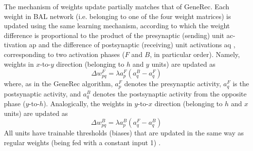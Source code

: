 The mechanism of weights update partially matches that of GeneRec. Each
weight in BAL network (i.e. belonging to one of the four weight matrices) is
updated using the same learning mechanism, according to which the weight
difference is proportional to the product of the presynaptic (sending) unit ac-
tivation ap and the difference of postsynaptic (receiving) unit activations aq ,
corresponding to two activation phases ($F$ and $B$, in particular order). Namely,
weights in $x$-to-$y$ direction (belonging to $h$ and $y$ units) are updated as
$$
\Delta w_{pq}^F = \lambda a_p^F(a_q^B - a_q^F)
$$
where, as in the GeneRec algorithm, $a^F_p$ denotes the presynaptic activity, $a^F_q$ is the postsynaptic activity, and $a^B_q$ denotes the postsynaptic activity from the opposite phase ($y$-to-$h$). Analogically, the weights in $y$-to-$x$ direction (belonging to $h$ and $x$ units) are updated as 
$$
\Delta w_{pq}^B = \lambda a^B_p(a_q^F - a_q^B)
$$
All units have trainable thresholds (biases) that are updated in the same way
as regular weights (being fed with a constant input 1) \cite{farkas2013bal}.
 


